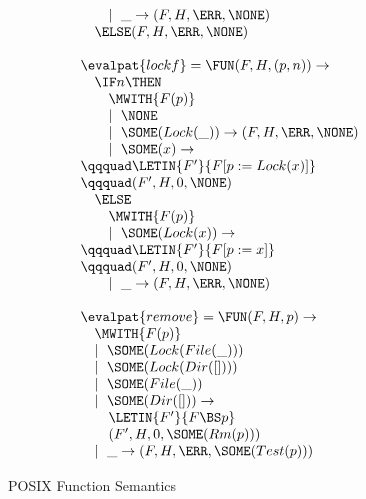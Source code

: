 \begin{figure*}
\begin{minipage}[t]{0.5\linewidth}
\begin{displaymath}
\begin{array}{l}
\qquad \mid~\_  \rightarrow (F,H,\ERR,\NONE) \\
\quad \ELSE (F,H,\ERR,\NONE) \\
\\
\evalpat{lockf} = \FUN (F,H,(p,n)) \rightarrow \\
\quad \IF n \THEN \\
\qquad \MWITH{F(p)} \\
\qquad \mid~\NONE \\
\qquad \mid~\SOME(Lock(\_)) \rightarrow (F,H,\ERR,\NONE) \\
\qquad \mid~\SOME(x) \rightarrow \\
\qqquad \LETIN{F'}{F[p := Lock(x)]} \\
\qqquad (F',H,0,\NONE) \\
\quad \ELSE \\
\qquad \MWITH{F(p)} \\
\qquad \mid~\SOME(Lock(x)) \rightarrow \\
\qqquad \LETIN{F'}{F[p := x]} \\
\qqquad (F',H,0,\NONE) \\
\qquad \mid~\_ \rightarrow (F,H,\ERR,\NONE) \\
\\
\evalpat{remove} = \FUN (F,H,p) \rightarrow \\
\quad \MWITH{F(p)} \\
\quad \mid~\SOME(Lock(File(\_))) \\
\quad \mid~\SOME(Lock(Dir([]))) \\
\quad \mid~\SOME(File(\_)) \\
\quad \mid~\SOME(Dir([])) \rightarrow \\
\qquad \LETIN{F'}{F \BS p} \\
\qquad (F',H,0,\SOME(Rm(p))) \\
\quad \mid~\_  \rightarrow (F,H,\ERR,\SOME(Test(p)))
\end{array}
\end{displaymath}
\end{minipage}
\caption{POSIX Function Semantics}
\end{figure*}


